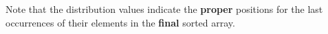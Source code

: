 \documentclass[preview]{standalone}
\begin{document}
\begin{center}
Note that the distribution values indicate the \textbf{proper} positions for the last occurrences of their elements in the \textbf{final} sorted array.
\end{center}
\end{document}
